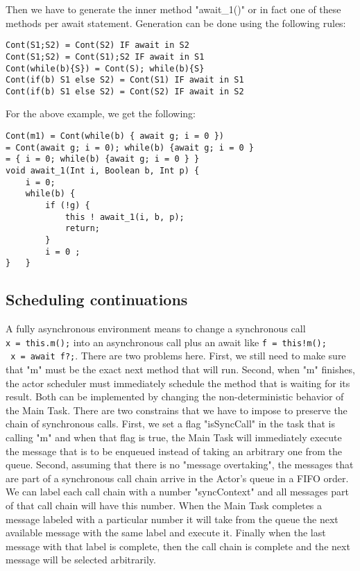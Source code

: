 Then we have to generate the inner method "await\_1()" or in fact one of these methods per await statement. Generation can be done using the following rules:

\begin{lstlisting}
Cont(S1;S2) = Cont(S2) IF await in S2
Cont(S1;S2) = Cont(S1);S2 IF await in S1
Cont(while(b){S}) = Cont(S); while(b){S}
Cont(if(b) S1 else S2) = Cont(S1) IF await in S1
Cont(if(b) S1 else S2) = Cont(S2) IF await in S2
\end{lstlisting}
For the above example, we get the following:

\begin{lstlisting}
Cont(m1) = Cont(while(b) { await g; i = 0 })
= Cont(await g; i = 0); while(b) {await g; i = 0 }
= { i = 0; while(b) {await g; i = 0 } }
void await_1(Int i, Boolean b, Int p) {
	i = 0; 
	while(b) {
		if (!g) {
			this ! await_1(i, b, p);
			return;
		}
		i = 0 ;
}	}
\end{lstlisting}

\subsection{Scheduling continuations}
A fully asynchronous environment means to change a synchronous call \\ \lstinline|x = this.m();| into an asynchronous call plus an await like \lstinline|f = this!m();| \\ \lstinline| x = await f?;|. There are two problems here. First, we still need to make sure that "m" must be the exact next method that will run. Second, when "m" finishes, the actor scheduler must immediately schedule the method that is waiting for its result. Both can be implemented by changing the non-deterministic behavior of the Main Task. There are two constrains that we have to impose to preserve the chain of synchronous calls. First, we set a flag "isSyncCall" in the task that is calling "m" and when that flag is true, the Main Task will immediately execute the message that is to be enqueued instead of taking an arbitrary one from the queue. Second, assuming that there is no "message overtaking", the messages that are part of a synchronous call chain arrive in the Actor's queue in a FIFO order. We can label each call chain with a number "syncContext" and all messages part of that call chain will have this number. When the Main Task completes a message labeled with a particular number it will take from the queue the next available message with the same label and execute it. Finally when the last message with that label is complete, then the call chain is complete and the next message will be selected arbitrarily.

